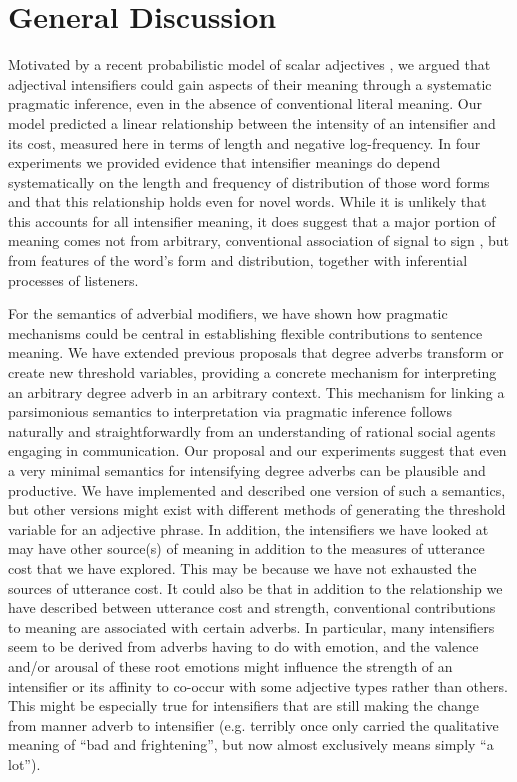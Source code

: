 \documentclass[10pt,letterpaper]{article}
\begin{document}
\section{General Discussion}

Motivated by a recent probabilistic model of scalar adjectives \cite{lassiter}, we argued that adjectival intensifiers could gain aspects of their meaning through a systematic pragmatic inference, even in the absence of conventional literal meaning. Our model predicted a linear relationship between the intensity of an intensifier and its cost, measured here in terms of length and negative log-frequency.
In four experiments we provided evidence that intensifier meanings do depend systematically on the length and frequency of distribution of those word forms and that this relationship holds even for novel words.
While it is unlikely that this accounts for all intensifier meaning, it does suggest that a major portion of meaning comes not from arbitrary, conventional association of signal to sign \cite{saussure}, but from features of the word's form and distribution, together with inferential processes of listeners.


For the semantics of adverbial modifiers, we have shown how pragmatic mechanisms could be central in establishing flexible contributions to sentence meaning.
We have extended previous proposals that degree adverbs transform or create new threshold variables, providing a concrete mechanism for interpreting an arbitrary degree adverb in an arbitrary context.
This mechanism for linking a parsimonious semantics to interpretation via pragmatic inference follows naturally and straightforwardly from an understanding of rational social agents engaging in communication.
Our proposal and our experiments suggest that even a very minimal semantics for intensifying degree adverbs can be plausible and productive.
We have implemented and described one version of such a semantics, but other versions might exist with different methods of generating the threshold variable for an adjective phrase.
In addition, the intensifiers we have looked at may have other source(s) of meaning in addition to the measures of utterance cost that we have explored. This may be because we have not exhausted the sources of utterance cost. It could also be that in addition to the relationship we have described between utterance cost and strength, conventional contributions to meaning are associated with certain adverbs. In particular, many intensifiers seem to be derived from adverbs having to do with emotion, and the valence and/or arousal of these root emotions might influence the strength of an intensifier or its affinity to co-occur with some adjective types rather than others. This might be especially true for intensifiers that are still making the change from manner adverb to intensifier (e.g. terribly once only carried the qualitative meaning of ``bad and frightening'', but now almost exclusively means simply ``a lot'').
\end{document}
